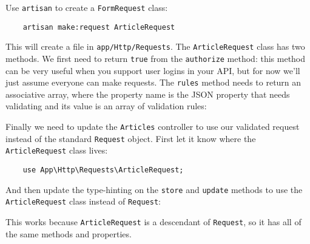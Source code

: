 Use \texttt{artisan} to create a \texttt{FormRequest} class:

\begin{verbatim}
    artisan make:request ArticleRequest
\end{verbatim}

This will create a file in \texttt{app/Http/Requests}. The \texttt{ArticleRequest} class has two methods. We first need to return \texttt{true} from the \texttt{authorize} method: this method can be very useful when you support user logins in your API, but for now we'll just assume everyone can make requests. The \texttt{rules} method needs to return an associative array, where the property name is the JSON property that needs validating and its value is an array of validation rules:



Finally we need to  update the \texttt{Articles} controller to use our validated request instead of the standard \texttt{Request} object. First let it know where the \texttt{ArticleRequest} class lives:

\begin{verbatim}
    use App\Http\Requests\ArticleRequest;
\end{verbatim}

And then update the type-hinting on the \texttt{store} and \texttt{update} methods to use the \texttt{ArticleRequest} class instead of \texttt{Request}:


This works because \texttt{ArticleRequest} is a descendant of \texttt{Request}, so it has all of the same methods and properties.


